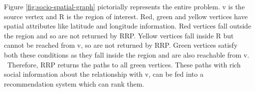 Figure \ref{fig:socio-spatial-graph} pictorially represents the entire problem. v is the source vertex and R is the region of interest. Red, green and yellow vertices have spatial attributes like latitude and longitude information. Red vertices fall outside the region and so are not returned by RRP. Yellow vertices fall inside R but cannot be reached from v, so are not returned by RRP. Green vertices satisfy both these conditions as they fall inside the region and are also reachable from v. ~Therefore, RRP returns the paths to all green vertices. These paths with rich social information about the relationship with v, can be fed into a recommendation system which can rank them.
\fi